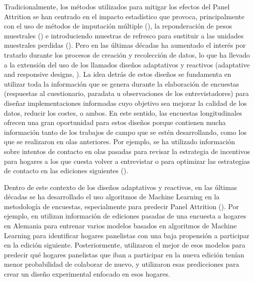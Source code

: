 Tradicionalmente, los métodos utilizados para mitigar los efectos del Panel Attrition se han centrado en el impacto estadístico que provoca, principalmente con el uso de métodos de imputación múltiple (\cite{rubin1987multiple}), la reponderación de pesos muestrales (\cite{groves2009survey}) e introduciendo muestras de refresco para sustituir a las unidades muestrales perdidas (\cite{hirano1998combining}). Pero en las últimas décadas ha aumentado el interés por tratarlo durante los procesos de creación y recolección de datos, lo que ha llevado a la extensión del uso de los llamados diseños adaptativos y reactivos (adaptative and responsive designs, \cite{tourangeau2017adaptive}). La idea detrás de estos diseños se fundamenta en utilizar toda la información que se genera durante la elaboración de encuestas (respuestas al cuestionario, paradata u observaciones de los entrevistadores) para diseñar implementaciones informadas cuyo objetivo sea mejorar la calidad de los datos, reducir los costes, o ambos. En este sentido, las encuestas longitudinales ofrecen una gran oportunidad para estos diseños porque contienen mucha información tanto de los trabajos de campo que se estén desarrollando, como los que se realizaron en olas anteriores. Por ejemplo, se ha utilizado información sobre intentos de contacto en olas pasadas para revisar la estrategia de incentivos para hogares a los que cuesta volver a entrevistar \cite{mcgonagle2022effects} o para optimizar las estrategias de contacto en las ediciones siguientes (\cite{kreuter2015note}).

Dentro de este contexto de los diseños adaptativos y reactivos, en las últimas décadas se ha desarrollado el uso algoritmos de Machine Learning en la metodología de encuestas, especialmente para predecir Panel Attrition (\cite{buskirk2018introduction}). Por ejemplo, en \cite{beste2023case} utilizan información de ediciones pasadas de una encuesta a hogares en Alemania para entrenar varios modelos basados en algoritmos de Machine Learning para identificar hogares panelistas con una baja propensión a participar en la edición siguiente. Posteriormente, utilizaron el mejor de esos modelos para predecir qué hogares panelistas que iban a participar en la nueva edición tenían menor probabilidad de colaborar de nuevo, y utilizaron esas predicciones para crear un diseño experimental enfocado en esos hogares.


